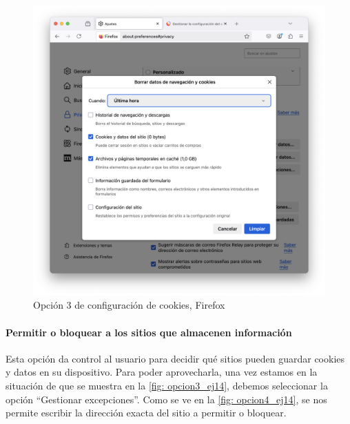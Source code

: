 \begin{figure}[H]   
    \includegraphics[width=\textwidth]{opcion3_ej14.png}
    \caption{Opción 3 de configuración de cookies, Firefox}
    \label{fig:opcion3_ej14}
\end{figure}

\paragraph{Permitir o bloquear a los sitios que almacenen información }

Esta opción da control al usuario para decidir qué sitios pueden guardar cookies y datos en su dispositivo. Para poder aprovecharla, una vez estamos en la situación de que se muestra en la \ref{fig: opcion3_ej14}, debemos seleccionar la opción “Gestionar excepciones”. Como se ve en la \ref{fig: opcion4_ej14}, se nos permite escribir la dirección exacta del sitio a permitir o bloquear. 

